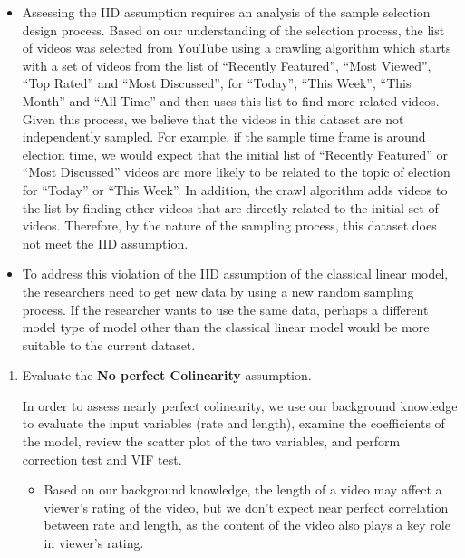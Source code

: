 \documentclass[
]{article}
\providecommand{\tightlist}{%
  \setlength{\itemsep}{0pt}\setlength{\parskip}{0pt}}
\begin{document}
\begin{itemize}
\item
  Assessing the IID assumption requires an analysis of the sample
  selection design process. Based on our understanding of the selection
  process, the list of videos was selected from YouTube using a crawling
  algorithm which starts with a set of videos from the list of
  ``Recently Featured'', ``Most Viewed'', ``Top Rated'' and ``Most
  Discussed'', for ``Today'', ``This Week'', ``This Month'' and ``All
  Time'' and then uses this list to find more related videos. Given this
  process, we believe that the videos in this dataset are not
  independently sampled. For example, if the sample time frame is around
  election time, we would expect that the initial list of ``Recently
  Featured'' or ``Most Discussed'' videos are more likely to be related
  to the topic of election for ``Today'' or ``This Week''. In addition,
  the crawl algorithm adds videos to the list by finding other videos
  that are directly related to the initial set of videos. Therefore, by
  the nature of the sampling process, this dataset does not meet the IID
  assumption.
\item
  To address this violation of the IID assumption of the classical
  linear model, the researchers need to get new data by using a new
  random sampling process. If the researcher wants to use the same data,
  perhaps a different model type of model other than the classical
  linear model would be more suitable to the current dataset.
\end{itemize}

\begin{enumerate}
\def\labelenumi{\arabic{enumi}.}
\setcounter{enumi}{1}
\item
  Evaluate the \textbf{No perfect Colinearity} assumption.

  In order to assess nearly perfect colinearity, we use our background
  knowledge to evaluate the input variables (rate and length), examine
  the coefficients of the model, review the scatter plot of the two
  variables, and perform correction test and VIF test.

  \begin{itemize}
  \tightlist
  \item
    Based on our background knowledge, the length of a video may affect
    a viewer's rating of the video, but we don't expect near perfect
    correlation between rate and length, as the content of the video
    also plays a key role in viewer's rating.
  \end{itemize}
\end{enumerate}
\end{document}
